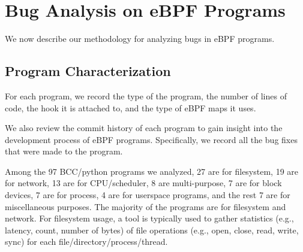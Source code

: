 \section{Bug Analysis on eBPF Programs}
\label{sec:case_study}


We now describe our methodology for analyzing bugs in eBPF programs.



\subsection{Program Characterization}
For each program, we record the type of the program, the number of lines of code, the hook it is attached to, and the type of eBPF maps it uses.

We also review the commit history of each program to gain insight into the development process of eBPF programs. Specifically, we record all the bug fixes that were made to the program.

Among the 97 BCC/python programs we analyzed, 27 are for filesystem, 19 are for network, 13 are for CPU/scheduler, 8 are multi-purpose, 7 are for block devices, 7 are for process, 4 are for userspace programs, and the rest 7 are for miscellaneous purposes.
The majority of the programs are for filesystem and network.
For filesystem usage, a tool is typically used to gather statistics (e.g., latency, count, number of bytes) of file operations (e.g., open, close, read, write, sync) for each file/directory/process/thread.


